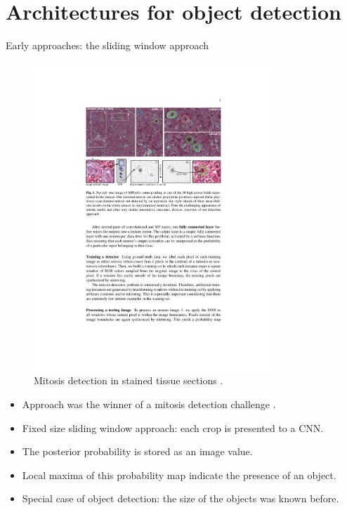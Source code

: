 \documentclass[xcolor=pdftex,dvipsnames,table]{beamer}
\begin{document}
\section{Architectures for object detection}
\begin{frame}{Early approaches: the sliding window approach}
\begin{figure}[htb]
   \centering
   \includegraphics[width=0.8\textwidth]{../graphics/mitosis_detection.pdf}
   \caption{Mitosis detection in stained tissue sections \cite{Ciresan2013}.}
\end{figure}

\begin{itemize}
\item Approach was the winner of a mitosis detection challenge \cite{Ciresan2013}. 
\item Fixed size sliding window approach: each crop is presented to a CNN.
\item The posterior probability is stored as an image value.
\item Local maxima of this probability map indicate the presence of an object.
\item Special case of object detection: the size of the objects was known before.
\end{itemize}
\end{frame}
\end{document}
